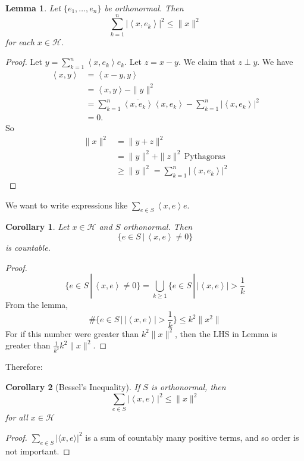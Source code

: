 \documentclass[10pt, oneside, reqno]{amsart}
\theoremstyle{plain}%
\newtheorem{lem}[thm]{Lemma}
\newtheorem*{cor}{Corollary}
\theoremstyle{definition}
\theoremstyle{remark}
\newcommand{\Hil}{\mathcal{H}}
\newcommand{\iprod}[1]{\left\langle #1 \right\rangle}
\newcommand{\sumkn}{\sum_{k=1}^n}
\begin{document}
\begin{lem}
    Let $\{ e_1, \dots, e_n \}$ be orthonormal. Then \[
        \sumkn | \iprod{x, e_k} |^2 \leq \|x\|^2 
    \] for each $x \in \Hil$.  
\end{lem}
\begin{proof}
    Let $y = \sumkn \iprod{x, e_k} e_k$.  Let $z = x-y$.  We claim that $z \perp y$.  We have 
    \begin{align*}
        \iprod{x,y} &= \iprod{x-y, y} \\
                    &= \iprod{x,y} - \| y \|^2 \\
                    &= \sumkn \overline{\iprod{x,e_k}} \iprod{x, e_k} - \sumkn | \iprod {x, e_k} |^2 \\
                    &= 0.
    \end{align*}
    So \begin{align*}
        \| x \|^2   &= \|y + z \|^2 \\
                    &= \| y \|^2 + \| z \|^2 \, \text{Pythagoras} \\
                    &\geq \|y \|^2 = \sumkn | \iprod{x, e_k} |^2
    \end{align*} 
\end{proof}

We want to write expressions like $\sum_{e \in S} \iprod{x, e} e$.
\begin{cor}
    Let $x \in \Hil$ and $S$ orthonormal.  Then \[
        \{ e \in S \, | \, \iprod{x, e} \neq 0 \}
    \] is countable.  
\end{cor}

\begin{proof}
    \[
        \{ e \in S \, | \, \iprod{x, e} \neq 0 \} = \bigcup_{k \geq 1} \{ e \in S \, | \, |\iprod{x, e} | > \frac{1}{k}
    \] From the lemma, \[
        \# \{ e \in S \, | \, | \iprod{x,e} | > \frac{1}{k} \} \leq k^2 \| x ^2 \|
    \] For if this number were greater than $k^2 \| x \|^2$, then the LHS in Lemma is greater than $\frac{1}{k^2}k^2 \| x \|^2$.  
\end{proof} 

Therefore:
\begin{cor}[Bessel's Inequality]
    If $S$ is orthonormal, then \[
        \sum_{e \in S} | \iprod{x,e}|^2 \leq \| x \|^2
    \] for all $x \in \Hil$
\end{cor}
\begin{proof}
    $\sum_{e \in S} | \langle x, e \rangle|^2$ is a sum of countably many positive terms, and so order is not important.
\end{proof}
\end{document}
